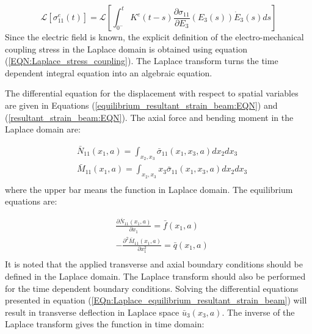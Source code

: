 \begin{equation}
\mathcal{L} \left[ \sigma_{11}^e(t) \right]=\mathcal{L} \left[
\int_{0^-}^t
K^e (t-s) \frac{\partial \sigma_{11}}{\partial E_{3}}(E_3(s))  \dot{E}_{3} (s)ds
\right]
\label{EQN:Laplace_stress_coupling}
\end{equation}
Since the electric field is known, the explicit definition of the electro-mechanical coupling stress in the Laplace domain is obtained using equation (\ref{EQN:Laplace_stress_coupling}).
The Laplace transform turns the time dependent integral equation into an algebraic equation.


The differential equation for the displacement with respect to spatial variables are given in Equations (\ref{equilibrium_resultant_strain_beam:EQN}) and (\ref{resultant_strain_beam:EQN}).
The axial force and bending moment in the Laplace domain are:

\begin{equation}
\begin{aligned}
&\bar{N}_{11} (x_1,a)=\int_{x_2,x_3} \bar{\sigma}_{11} (x_1,x_3,a) dx_2 dx_3 \\
&\bar{M}_{11} (x_1,a)=\int_{x_2,x_3} x_3 \bar{ \sigma}_{11} (x_1,x_3,a) dx_2 dx_3 \\
\end{aligned}
\label{EQN:laplac_resultant_strain_beam}
\end{equation}
where the upper bar means the function in Laplace domain.
The equilibrium equations are:

\begin{equation}
\begin{aligned}
& \frac{\partial \bar{N}_{11} (x_1,a)}{\partial x_1}=\bar{f}(x_1,a) \\
& -\frac{\partial^2 \bar{M}_{11} (x_1,a)}{ \partial x^2_1}=\bar{q}(x_1,a)\\
\end{aligned}
\label{EQn:Laplace_equilibrium_resultant_strain_beam}
\end{equation}
It is noted that the applied transverse and axial boundary conditions should be defined in the Laplace domain.
The Laplace transform should also be performed for the time dependent boundary conditions.
Solving the differential equations presented in equation (\ref{EQn:Laplace_equilibrium_resultant_strain_beam}) will result in transverse deflection in Laplace space $\bar{u}_3(x_3,a)$.
The inverse of the Laplace transform gives the function in time domain:

